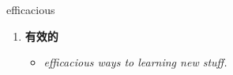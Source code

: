 
\begin{frame}
{\huge efficacious}
\begin{center}
\begin{enumerate}\Large
  \item \textbf{有效的}
  \begin{itemize}
    \item \em{\Large{efficacious ways to learning new stuff.}}
  \end{itemize}
\end{enumerate}
\end{center}
\end{frame}
